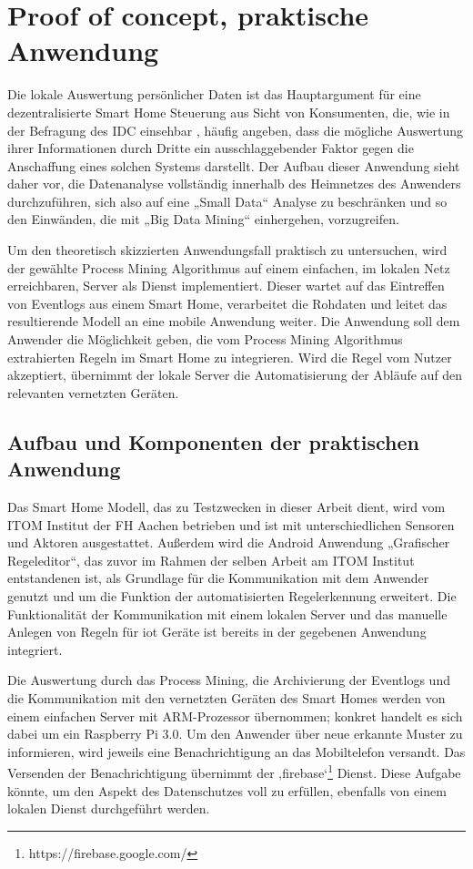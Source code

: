 \chapter{Proof of concept, praktische Anwendung}\label{chap:experiments}
Die lokale Auswertung persönlicher Daten ist das Hauptargument für eine dezentralisierte Smart Home Steuerung aus Sicht von Konsumenten, die, wie in der Befragung des IDC einsehbar \cite{IDC}, häufig angeben, dass die mögliche Auswertung ihrer Informationen durch Dritte ein ausschlaggebender Faktor gegen die Anschaffung eines solchen Systems darstellt. 
Der Aufbau dieser Anwendung sieht daher vor, die Datenanalyse vollständig innerhalb des Heimnetzes des Anwenders durchzuführen, sich also auf eine „Small Data“ Analyse zu beschränken und so den Einwänden, die mit „Big Data Mining“ einhergehen, vorzugreifen. 

Um den theoretisch skizzierten Anwendungsfall praktisch zu untersuchen, wird der gewählte Process Mining Algorithmus auf einem einfachen, im lokalen Netz erreichbaren, Server als Dienst implementiert. Dieser wartet auf das Eintreffen von Eventlogs aus einem Smart Home, verarbeitet die Rohdaten und leitet das resultierende Modell an eine mobile Anwendung weiter. Die Anwendung soll dem Anwender die Möglichkeit geben, die vom Process Mining Algorithmus extrahierten Regeln im Smart Home zu integrieren. Wird die Regel vom Nutzer akzeptiert, übernimmt der lokale Server die Automatisierung der Abläufe auf den relevanten vernetzten Geräten.

\section{Aufbau und Komponenten der praktischen Anwendung}
Das Smart Home Modell, das zu Testzwecken in dieser Arbeit dient, wird vom ITOM Institut der FH Aachen betrieben und ist mit unterschiedlichen Sensoren und Aktoren ausgestattet. 
Außerdem wird die Android Anwendung „Grafischer Regeleditor“, das zuvor im Rahmen der selben Arbeit am ITOM Institut entstandenen ist, als Grundlage für die Kommunikation mit dem Anwender genutzt und um die Funktion der automatisierten Regelerkennung erweitert. 
Die Funktionalität der Kommunikation mit einem lokalen Server und das manuelle Anlegen von Regeln für iot Geräte ist bereits in der gegebenen Anwendung integriert.

Die Auswertung durch das Process Mining, die Archivierung der Eventlogs und die Kommunikation mit den vernetzten Geräten des Smart Homes werden von einem einfachen Server mit ARM-Prozessor übernommen; konkret handelt es sich dabei um ein Raspberry Pi 3.0. Um den Anwender über neue erkannte Muster zu informieren, wird jeweils eine Benachrichtigung an das Mobiltelefon versandt. Das Versenden der Benachrichtigung übernimmt der  ‚firebase‘\footnote{https://firebase.google.com/} Dienst. Diese Aufgabe könnte, um den Aspekt des Datenschutzes voll zu erfüllen, ebenfalls von einem lokalen Dienst durchgeführt werden.

